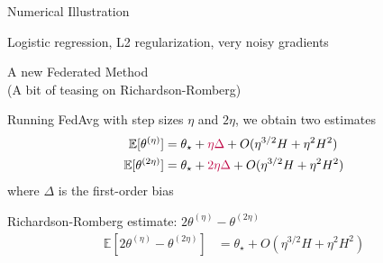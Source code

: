 \documentclass[aspectratio=169,14pt]{beamer}
\begin{document}
  \begin{frame}[t]{Numerical Illustration}
    \vspace{-1em}
    
    Logistic regression, L2 regularization, very noisy gradients

    \vspace{-1em}
    
    \begin{center}
    \end{center}

    \vspace{-1.5em}
    
  \end{frame}

  \begin{frame}{A new Federated Method\\[-0.5em]
    \small (A bit of teasing on Richardson-Romberg)}
    
    Running FedAvg with step sizes $\eta$ and $2 \eta$, we obtain two estimates
    \begin{align*}
      \mathbb{E}[ \theta^{(\eta)} ] & = \theta_\star + \textcolor{purple}{\eta \Delta} + O(\eta^{3/2} H + \eta^2 H^2) \\
      \mathbb{E}[ \theta^{(2\eta)} ] & = \theta_\star + \textcolor{purple}{2\eta \Delta} + O(\eta^{3/2} H + \eta^2 H^2)
    \end{align*}
    where $\Delta$ is the first-order bias

    \pause

    Richardson-Romberg estimate: $2 \theta^{(\eta)} - \theta^{(2\eta)}$
    \begin{align*}
      \mathbb{E}[ 2 \theta^{(\eta)} - \theta^{(2\eta)} ] & = \theta_\star + O(\eta^{3/2} H + \eta^2 H^2)
    \end{align*}
    
  \end{frame}
  
\end{document}
